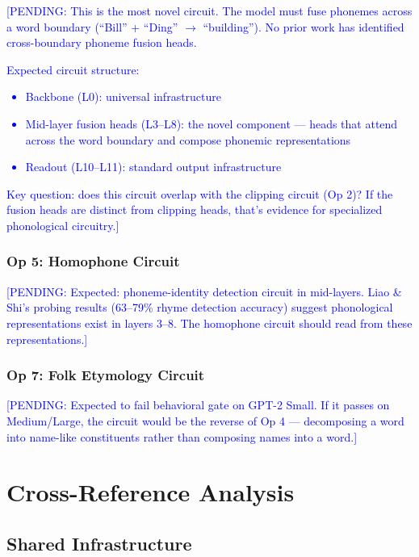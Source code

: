 \documentclass[11pt,a4paper]{article}
\newcommand{\PENDING}[1]{\textcolor{blue}{[PENDING: #1]}}
\begin{document}
\PENDING{This is the most novel circuit. The model must fuse phonemes across
a word boundary (``Bill'' + ``Ding'' $\to$ ``building''). No prior work has
identified cross-boundary phoneme fusion heads.

Expected circuit structure:
\begin{itemize}
  \item Backbone (L0): universal infrastructure
  \item Mid-layer fusion heads (L3--L8): the novel component --- heads that
  attend across the word boundary and compose phonemic representations
  \item Readout (L10--L11): standard output infrastructure
\end{itemize}

Key question: does this circuit overlap with the clipping circuit (Op 2)?
If the fusion heads are distinct from clipping heads, that's evidence for
specialized phonological circuitry.}

\subsubsection{Op 5: Homophone Circuit}

\PENDING{Expected: phoneme-identity detection circuit in mid-layers.
Liao \& Shi's probing results (63--79\% rhyme detection accuracy) suggest
phonological representations exist in layers 3--8. The homophone circuit
should read from these representations.}

\subsubsection{Op 7: Folk Etymology Circuit}

\PENDING{Expected to fail behavioral gate on GPT-2 Small. If it passes on
Medium/Large, the circuit would be the reverse of Op 4 --- decomposing a word
into name-like constituents rather than composing names into a word.}

\section{Cross-Reference Analysis}

\subsection{Shared Infrastructure}
\end{document}
